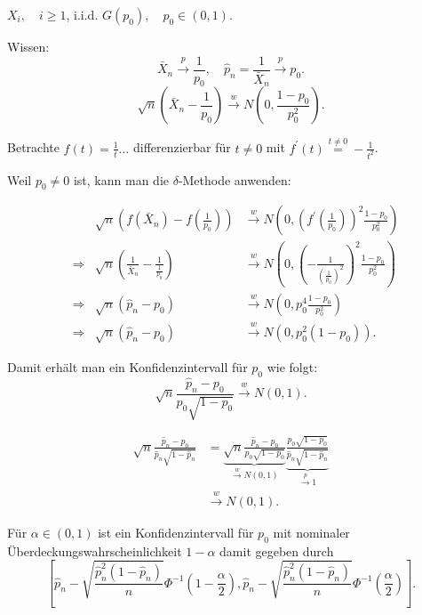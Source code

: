 \documentclass{tstextbook}
\begin{document}
\begin{example}
	
	$ X_i, \quad i \ge 1 $, i.i.d. $ G(p_0), \quad p_0 \in (0,1) $. 
	
	Wissen: \[ \bar{X}_n \xrightarrow{p} \frac{1}{p_0}, \quad \hat{p}_n = \frac{1}{\bar{X}_n} \xrightarrow{p} p_0 . 
	\]
	\[
	\sqrt{n}\left(\bar{X}_n-\frac{1}{p_0}\right) \xrightarrow{w} N\left(0, \frac{1-p_0}{p_0^2} \right) .
	\]
	
	Betrachte $ f(t) = \frac{1}{t} \ldots $ differenzierbar für $ t \ne 0 $ mit $ f^\prime(t) \overset{t\ne0}{=} - \frac{1}{t^2} $. 
	
	Weil $ p_0 \ne 0 $ ist, kann man die $ \delta $-Methode anwenden: 
	
	\[
	\begin{aligned}
	&& \sqrt{n}\left(f\left(\bar{X}_n\right) -f\left(\frac{1}{p_0}\right)\right) & \xrightarrow{w} N\left(0, \left(f^\prime \left(\frac{1}{p_0}\right)\right)^2 \frac{1-p_0}{p_0^2} \right) \\
	& \Rightarrow & \sqrt{n}\left(\frac{1}{\bar{X}_n} - \frac{1}{\frac{1}{p_0}}\right) & \xrightarrow{w} N\left(0, \left(-\frac{1}{\left(\frac{1}{p_0}\right)^2}\right)^2 \frac{1-p_0}{p_0^2} \right) \\
	& \Rightarrow & \sqrt{n}\left(\hat{p}_n - p_0 \right) & \xrightarrow{w} N\left(0, p_0^4\frac{1-p_0}{p_0^2} \right) \\
	& \Rightarrow & \sqrt{n}\left(\hat{p}_n-p_0\right) & \xrightarrow{w} N\left(0, p_0^2(1-p_0)\right).
	\end{aligned}
	\] 

	
	Damit erhält man ein Konfidenzintervall für $ p_0 $ wie folgt: 
	\[
	\sqrt{n}\frac{\hat{p}_n - p_0}{p_0\sqrt{1-p_0}} \xrightarrow{w} N(0,1).
	\]
	
	\[
	\begin{aligned}
	\sqrt{n}\frac{\hat{p}_n-p_0}{\hat{p}_n\sqrt{1-\hat{p}_n}} & = \underbrace{\sqrt{n}\frac{\hat{p}_n-p_0}{p_0\sqrt{1-p_0}}}_{\xrightarrow{w}N(0,1)} \underbrace{\frac{p_0\sqrt{1-p_0}}{\hat{p}_n\sqrt{1-\hat{p}_n}}}_{\xrightarrow{p}1} \\
	& \xrightarrow{w} N(0,1).
	\end{aligned}
	\]
	
	Für $ \alpha \in (0,1) $ ist ein Konfidenzintervall für $ p_0 $ mit nominaler Überdeckungswahrscheinlichkeit $ 1-\alpha $ damit gegeben durch 
	\[
	\left[ 
	\hat{p}_n - \sqrt{\frac{\hat{p}_n^2(1-\hat{p}_n)}{n}} \Phi^{-1} \left(1-\frac{\alpha}{2}\right), \hat{p}_n - \sqrt{\frac{\hat{p}_n^2(1-\hat{p}_n)}{n}} \Phi^{-1} \left(\frac{\alpha}{2}\right) \right] .
	\]
\end{example}
\end{document}

